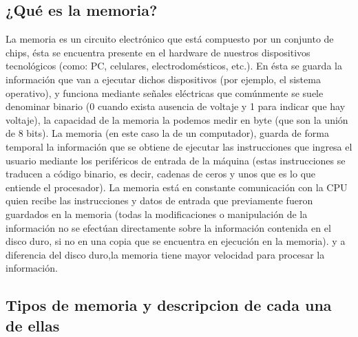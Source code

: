 \documentclass{article}
\begin{document}
\subsection{¿Qué es la memoria?} \label{contenido}
La memoria es un circuito electrónico que está compuesto por un conjunto de chips, ésta se encuentra presente en el hardware de nuestros dispositivos tecnológicos (como: PC, celulares, electrodomésticos, etc.). En ésta se guarda la información que van a ejecutar dichos dispositivos (por ejemplo, el sistema operativo), y funciona mediante señales eléctricas que comúnmente se suele denominar binario (0 cuando exista ausencia de voltaje y 1 para indicar que hay voltaje), la capacidad de la memoria la podemos medir en byte (que son la unión de 8 bits). La memoria (en este caso la de un computador), guarda de forma temporal la información que se obtiene de ejecutar las instrucciones que ingresa el usuario mediante los periféricos de entrada de la máquina (estas instrucciones se traducen a código binario, es decir, cadenas de ceros y unos que es lo que entiende el procesador). La memoria está en constante comunicación con la CPU quien recibe las instrucciones y datos de entrada que previamente fueron guardados en la memoria (todas la modificaciones o manipulación de la información no se efectúan directamente sobre la información contenida en el disco duro, si no en una copia que se encuentra en ejecución en la memoria). y a diferencia del disco duro,la memoria tiene mayor velocidad para procesar la información. 

\subsection{Tipos de memoria y descripcion de cada una de ellas}
\end{document}
